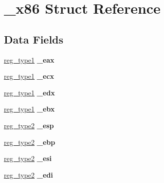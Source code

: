 \hypertarget{struct__x86}{}\section{\+\_\+x86 Struct Reference}
\label{struct__x86}
\subsection*{Data Fields}
\begin{DoxyCompactItemize}
\item 
\mbox{\label{struct__x86_a6c73d712959e36533451ae2d14ac00e7}} 
\mbox{\hyperlink{union__reg__type1}{reg\+\_\+type1}} {\bfseries \+\_\+eax}
\item 
\mbox{\label{struct__x86_a64fd48d0b8f2850eb376b2cb90cdae92}} 
\mbox{\hyperlink{union__reg__type1}{reg\+\_\+type1}} {\bfseries \+\_\+ecx}
\item 
\mbox{\label{struct__x86_a52bba1695fd61acc339f691897008d01}} 
\mbox{\hyperlink{union__reg__type1}{reg\+\_\+type1}} {\bfseries \+\_\+edx}
\item 
\mbox{\label{struct__x86_a669fb79b7e4fdc0cd3544842109ca80e}} 
\mbox{\hyperlink{union__reg__type1}{reg\+\_\+type1}} {\bfseries \+\_\+ebx}
\item 
\mbox{\label{struct__x86_a76b52d8de3bc4432db49c07c3f9ec339}} 
\mbox{\hyperlink{union__reg__type2}{reg\+\_\+type2}} {\bfseries \+\_\+esp}
\item 
\mbox{\label{struct__x86_ac188e23cd7c50d2f18ee8ce1960a3517}} 
\mbox{\hyperlink{union__reg__type2}{reg\+\_\+type2}} {\bfseries \+\_\+ebp}
\item 
\mbox{\label{struct__x86_ad5f409586a153faff0f68e926d591013}} 
\mbox{\hyperlink{union__reg__type2}{reg\+\_\+type2}} {\bfseries \+\_\+esi}
\item 
\mbox{\label{struct__x86_a80505efd0ac3d639d376c9feb68ba0d9}} 
\mbox{\hyperlink{union__reg__type2}{reg\+\_\+type2}} {\bfseries \+\_\+edi}
\item 
\mbox{\label{struct__x86_a57e2a657cf74a5a37f513db7186b0f95}} 

\end{DoxyCompactItemize}
